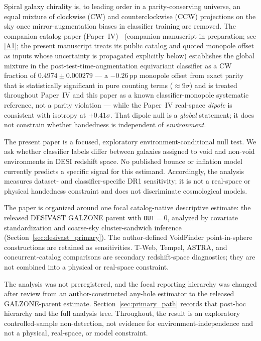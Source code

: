 \documentclass[aps,prd,twocolumn,superscriptaddress,showpacs,preprintnumbers,nofootinbib,longbibliography,floatfix]{revtex4-2}
\newcommand{\repoBase}{https://github.com/Hubify-Projects/bigbounce/blob/main}
\newcommand{\paperIVarxiv}{companion manuscript in preparation}
\begin{document}
Spiral galaxy chirality is, to leading order in a parity-conserving
universe, an equal mixture of clockwise (CW) and counterclockwise (CCW)
projections on the sky once mirror-augmentation biases in classifier
training are removed. The companion catalog paper (Paper~IV)~\cite{golden_chirality_2026}
(\paperIVarxiv;
see \href{\repoBase/pipelines/p2\_chirality/}{[A1]}; the present manuscript
treats its public catalog and quoted monopole offset as inputs whose
uncertainty is propagated explicitly below)
establishes the global mixture in the post-test-time-augmentation
equivariant classifier as a CW fraction of $0.4974 \pm 0.000279$ ---
a $-0.26$\,pp monopole offset from exact parity that is statistically
significant in pure counting terms ($\approx\!9\sigma$) and is treated
throughout Paper~IV and this paper as a known classifier-monopole
systematic reference, not a parity violation --- while the Paper~IV
real-space \emph{dipole} is consistent with isotropy at $+0.41\sigma$.
That dipole null is a \emph{global} statement; it
does not constrain whether handedness is independent of
\emph{environment}.

The present paper is a focused, exploratory environment-conditional null
test. We ask whether classifier labels differ between galaxies assigned
to void and non-void environments in DESI redshift space. No published
bounce or inflation model currently predicts a specific signal for this
estimand. Accordingly, the analysis measures dataset- and
classifier-specific DR1 sensitivity; it is not a real-space or physical
handedness constraint and does not discriminate cosmological models.

The paper is organized around one focal catalog-native descriptive estimate:
the released DESIVAST GALZONE parent with \texttt{OUT}$=0$, analyzed by
covariate standardization and coarse-sky cluster-sandwich inference
(Section~\ref{sec:desivast_primary}). The author-defined VoidFinder
point-in-sphere constructions are retained as sensitivities. T-Web,
Tempel, ASTRA, and concurrent-catalog comparisons are secondary
redshift-space diagnostics; they are not combined into a physical or
real-space constraint.

The analysis was not preregistered, and the focal reporting hierarchy was
changed after review from an author-constructed any-hole estimator to the
released GALZONE-parent estimate. Section~\ref{sec:primary_path} records
that post-hoc hierarchy and the full analysis tree. Throughout, the
result is an exploratory controlled-sample non-detection, not evidence
for environment-independence and not a physical, real-space, or model
constraint.
\end{document}
